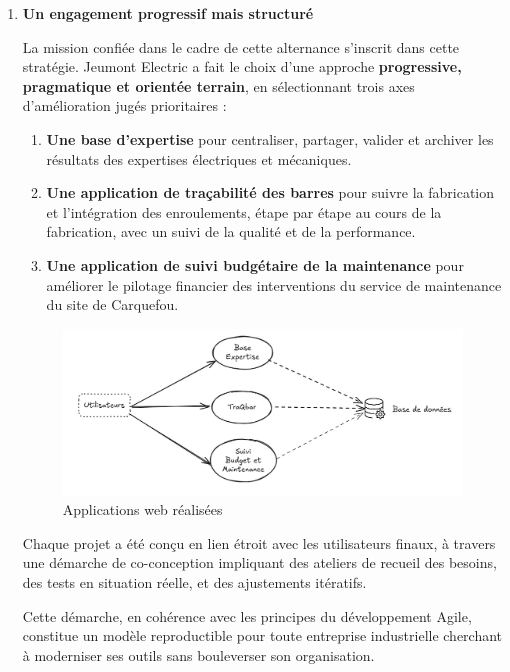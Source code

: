 \documentclass[11pt,a4paper]{article}
\begin{document}
\begin{enumerate}
\item \textbf{Un engagement progressif mais structuré}

La mission confiée dans le cadre de cette alternance s’inscrit dans cette stratégie. Jeumont Electric a fait le choix d’une approche \textbf{progressive, pragmatique et orientée terrain}, en sélectionnant trois axes d’amélioration jugés prioritaires :

\begin{enumerate}
    \item \textbf{Une base d’expertise} pour centraliser, partager, valider et archiver les résultats des expertises électriques et mécaniques.
    \item \textbf{Une application de traçabilité des barres}  pour suivre la fabrication et l’intégration des enroulements, étape par étape au cours de la fabrication, avec un suivi de la qualité et de la performance.
    \item \textbf{Une application de suivi budgétaire de la maintenance} pour améliorer le pilotage financier des interventions du service de maintenance du site de Carquefou.
\end{enumerate}


\begin{figure}[H]
    \centering
    \includegraphics[width=\textwidth]{../Images/application-web.png}
    \caption{Applications web réalisées }
\end{figure}

Chaque projet a été conçu en lien étroit avec les utilisateurs finaux, à travers une démarche de co-conception impliquant des ateliers de recueil des besoins, des tests en situation réelle, et des ajustements itératifs.

Cette démarche, en cohérence avec les principes du développement Agile, constitue un modèle reproductible pour toute entreprise industrielle cherchant à moderniser ses outils sans bouleverser son organisation.

\end{enumerate}
\end{document}
